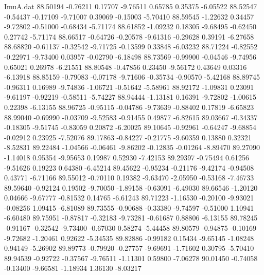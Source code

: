 \begin{filecontents}{ImuA.dat}
  88.50194   -0.76211    0.17707   -9.76511    0.65785    0.35375   -6.05522
  88.52547   -0.54437   -0.17109   -9.71007    0.39069   -0.15003   -5.70410
  88.59545   -1.22632    0.34457   -9.72802   -0.51000   -0.68434   -5.71174
  88.61852   -1.09232    0.18305   -9.68495   -0.62450    0.27742   -5.71174
  88.66517   -0.64726   -0.20578   -9.61316   -0.29628    0.39191   -6.27658
  88.68820   -0.61137   -0.32542   -9.71725   -0.13599    0.33848   -6.03232
  88.71224   -0.82552   -0.22971   -9.73400    0.03957   -0.02790   -6.18498
  88.73569   -0.99900   -0.04546   -9.74956    0.65021    0.26978   -6.21551
  88.80548   -0.47856    0.23450   -9.56172    0.43649    0.03316   -6.13918
  88.85159   -0.79083   -0.07178   -9.71606   -0.35734   -0.90570   -5.42168
  88.89745   -0.96311    0.16989   -9.74836   -1.06721   -0.51642   -5.58961
  88.92172   -1.09831    0.23091   -9.61197   -0.92219   -0.58511   -5.74227
  88.94444   -1.13181    0.16391   -9.72802   -1.00615    0.22398   -6.13155
  88.96725   -0.95115   -0.04786   -9.73639   -0.88402    0.17819   -6.65823
  88.99040   -0.69990   -0.03709   -9.52583   -0.91455    0.49877   -6.82615
  89.03667   -0.34337   -0.18305   -9.51745   -0.83059    0.20872   -6.20025
  89.10645   -0.92961   -0.64247   -9.68854   -0.02912    0.23925   -7.52076
  89.17863   -0.84227   -0.21775   -9.60359    0.13880    0.32321   -8.52831
  89.22484   -1.04566   -0.06461   -9.86202   -0.12835   -0.01264   -8.89470
  89.27090   -1.14018    0.95354   -9.95653    0.19987    0.52930   -7.42153
  89.29397   -0.75494    0.61256   -9.51626    0.19223    0.64380   -6.45214
  89.45622   -0.95234   -0.21176   -9.42174   -0.94508    0.43771   -6.71166
  89.55012   -0.70110    0.19382   -9.63470   -2.05950   -0.53168   -7.46733
  89.59640   -0.92124    0.19502   -9.70050   -1.89158   -0.63091   -6.49030
  89.66546   -1.20120    0.04666   -9.67777   -0.81532    0.14765   -6.61243
  89.71223   -1.16530   -0.20100   -9.93021   -0.08256    1.09415   -6.81089
  89.73555   -0.90688   -0.33380   -9.74597   -0.51000    1.10941   -6.60480
  89.75951   -0.87817   -0.32183   -9.73281   -0.61687    0.88806   -6.13155
  89.78245   -0.91167   -0.32542   -9.73400   -0.67030    0.58274   -5.44458
  89.80579   -0.94875   -0.10169   -9.72682   -1.20461    0.92622   -5.34535
  89.82886   -0.99182    0.15434   -9.65145   -1.08248    0.94149   -5.26902
  89.89773   -0.79920   -0.27757   -9.69691   -1.71602    0.30795   -5.70410
  89.94539   -0.92722   -0.37567   -9.76511   -1.11301    0.59800   -7.06278
  90.01450   -0.74058   -0.13400   -9.66581   -1.18934    1.36130   -8.03217

\end{filecontents}
